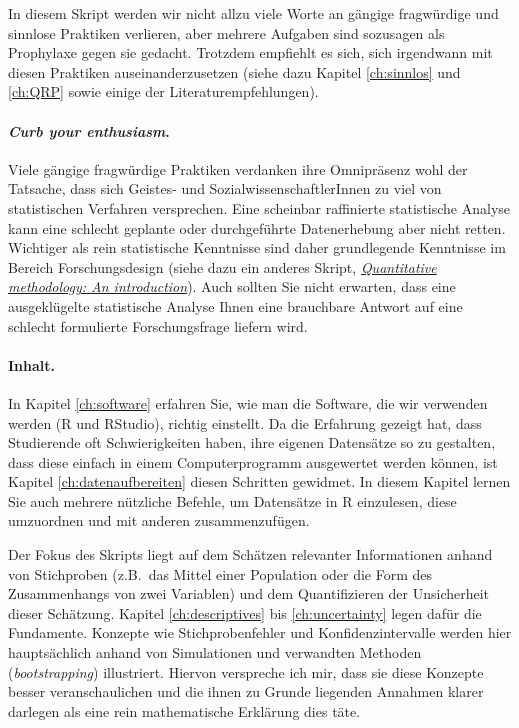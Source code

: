 \documentclass[oneside, 10pt]{book}\usepackage[]{graphicx}\usepackage[]{xcolor}
\begin{document}
In diesem Skript werden wir nicht allzu viele Worte 
an gängige fragwürdige und sinnlose Praktiken verlieren,
aber mehrere Aufgaben sind sozusagen als Prophylaxe gegen sie
gedacht.
Trotzdem empfiehlt es sich, sich irgendwann mit diesen Praktiken
auseinanderzusetzen (siehe dazu Kapitel \ref{ch:sinnlos} und \ref{ch:QRP}
sowie einige der Literaturempfehlungen).

\paragraph{\textit{Curb your enthusiasm}.}
Viele gängige fragwürdige Praktiken verdanken ihre Omnipräsenz
wohl der Tatsache, dass sich Geistes- und SozialwissenschaftlerInnen
zu viel von statistischen Verfahren versprechen.
Eine scheinbar raffinierte statistische Analyse kann eine schlecht
geplante oder durchgeführte Datenerhebung aber nicht retten.
Wichtiger als rein statistische Kenntnisse sind daher
grundlegende Kenntnisse im Bereich Forschungsdesign
(siehe dazu ein anderes Skript, \href{https://janhove.github.io/teaching/2020/12/16/quant-meth}{\textit{Quantitative methodology: An introduction}}).
Auch sollten Sie nicht erwarten, dass eine ausgeklügelte statistische
Analyse Ihnen eine brauchbare Antwort auf eine schlecht formulierte Forschungsfrage
liefern wird.

\paragraph{Inhalt.}
In Kapitel \ref{ch:software} erfahren Sie, wie man die Software, die wir
verwenden werden (R und RStudio), richtig einstellt. 
Da die Erfahrung gezeigt hat, dass Studierende oft
Schwierigkeiten haben, ihre eigenen Datensätze so zu gestalten,
dass diese einfach in einem Computerprogramm ausgewertet werden können,
ist Kapitel \ref{ch:datenaufbereiten} diesen Schritten gewidmet.
In diesem Kapitel lernen Sie auch mehrere nützliche Befehle,
um Datensätze in R einzulesen, diese umzuordnen und mit anderen
zusammenzufügen.

Der Fokus des Skripts liegt auf dem Schätzen
relevanter Informationen anhand von Stichproben (z.B.\ das Mittel
einer Population oder die Form des Zusammenhangs von zwei Variablen)
und dem Quantifizieren der Unsicherheit dieser Schätzung.
Kapitel \ref{ch:descriptives} bis \ref{ch:uncertainty}
legen dafür die Fundamente.
Konzepte wie Stichprobenfehler und Konfidenzintervalle
werden hier hauptsächlich anhand von Simulationen
und verwandten Methoden (\textit{bootstrapping}) illustriert.
Hiervon verspreche ich mir, dass sie diese Konzepte besser
veranschaulichen und die ihnen zu Grunde liegenden Annahmen
klarer darlegen als eine rein mathematische Erklärung dies täte.
\end{document}
